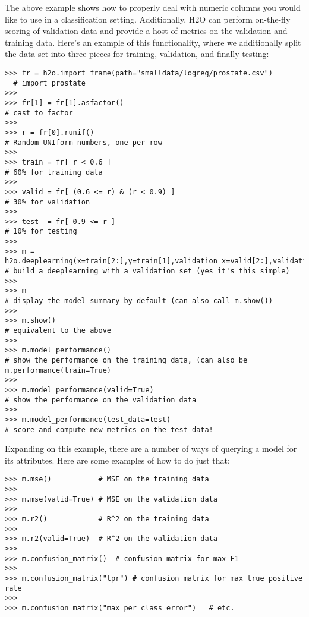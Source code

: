 The above example shows how to properly deal with numeric columns you would like to use in a classification setting. Additionally, H2O can perform on-the-fly scoring of validation data and provide a host of metrics on the validation and training data. Here's an example of this functionality, where we additionally split the data set into three pieces for training, validation, and finally testing:
\begin{lstlisting}[style=python]
>>> fr = h2o.import_frame(path="smalldata/logreg/prostate.csv")
  # import prostate
>>>
>>> fr[1] = fr[1].asfactor()                                     
# cast to factor
>>>
>>> r = fr[0].runif()                                            
# Random UNIform numbers, one per row
>>>
>>> train = fr[ r < 0.6 ]                                        
# 60% for training data
>>>
>>> valid = fr[ (0.6 <= r) & (r < 0.9) ]                         
# 30% for validation
>>>
>>> test  = fr[ 0.9 <= r ]                                       
# 10% for testing
>>>
>>> m = h2o.deeplearning(x=train[2:],y=train[1],validation_x=valid[2:],validation_y=valid[1])  # build a deeplearning with a validation set (yes it's this simple)
>>>
>>> m                                                            
# display the model summary by default (can also call m.show())
>>>
>>> m.show()                                                     
# equivalent to the above
>>>
>>> m.model_performance()                                        
# show the performance on the training data, (can also be m.performance(train=True)
>>>
>>> m.model_performance(valid=True)                              
# show the performance on the validation data
>>>
>>> m.model_performance(test_data=test)                          
# score and compute new metrics on the test data!
\end{lstlisting}


Expanding on this example, there are a number of ways of querying a model for its attributes. Here are some examples of how to do just that:
\begin{lstlisting}[style=python]
>>> m.mse()           # MSE on the training data
>>>
>>> m.mse(valid=True) # MSE on the validation data
>>>
>>> m.r2()            # R^2 on the training data
>>>
>>> m.r2(valid=True)  # R^2 on the validation data
>>>
>>> m.confusion_matrix()  # confusion matrix for max F1
>>>
>>> m.confusion_matrix("tpr") # confusion matrix for max true positive rate
>>>
>>> m.confusion_matrix("max_per_class_error")   # etc.
\end{lstlisting}

